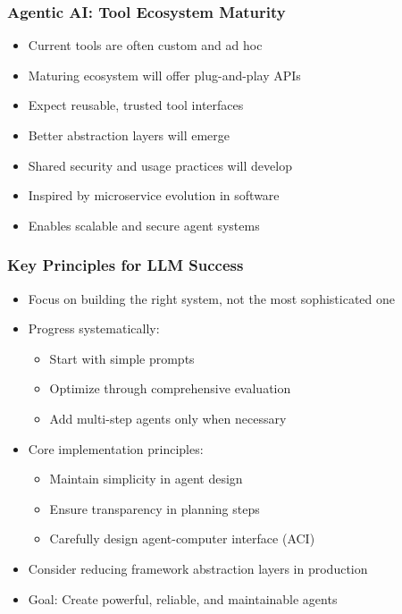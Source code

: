 \begin{frame}[fragile]\frametitle{Agentic AI: Tool Ecosystem Maturity}

      \begin{itemize}
        \item Current tools are often custom and ad hoc
        \item Maturing ecosystem will offer plug-and-play APIs
        \item Expect reusable, trusted tool interfaces
        \item Better abstraction layers will emerge
        \item Shared security and usage practices will develop
        \item Inspired by microservice evolution in software
        \item Enables scalable and secure agent systems
      \end{itemize}

\end{frame}




\begin{frame}[fragile]\frametitle{Key Principles for LLM Success}
    \begin{itemize}
        \item Focus on building the right system, not the most sophisticated one
        \item Progress systematically:
            \begin{itemize}
                \item Start with simple prompts
                \item Optimize through comprehensive evaluation
                \item Add multi-step agents only when necessary
            \end{itemize}
        \item Core implementation principles:
            \begin{itemize}
                \item Maintain simplicity in agent design
                \item Ensure transparency in planning steps
                \item Carefully design agent-computer interface (ACI)
            \end{itemize}
        \item Consider reducing framework abstraction layers in production
        \item Goal: Create powerful, reliable, and maintainable agents
    \end{itemize}
\end{frame}

